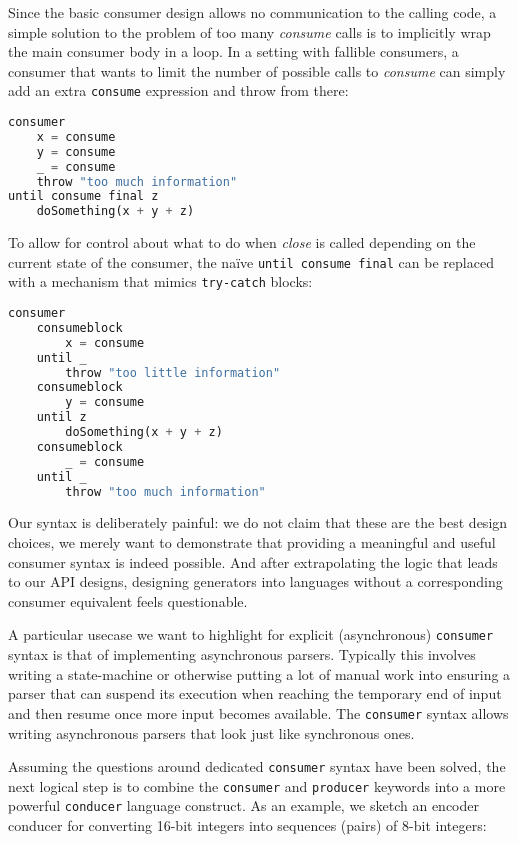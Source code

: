 \documentclass[sigplan,screen,10pt,review]{acmart}
\begin{document}
Since the basic consumer design allows no communication to the calling code, a simple solution to the problem of too many \textit{consume} calls is to implicitly wrap the main consumer body in a loop. In a setting with fallible consumers, a consumer that wants to limit the number of possible calls to \textit{consume} can simply add an extra \texttt{consume} expression and throw from there:

\begin{lstlisting}[language=Python]
consumer
    x = consume
    y = consume
    _ = consume
    throw "too much information"
until consume final z
    doSomething(x + y + z)
\end{lstlisting}

To allow for control about what to do when \textit{close} is called depending on the current state of the consumer, the naïve \texttt{until consume final} can be replaced with a mechanism that mimics \texttt{try-catch} blocks:

\begin{lstlisting}[language=Python]
consumer
    consumeblock
        x = consume
    until _
        throw "too little information"
    consumeblock
        y = consume
    until z
        doSomething(x + y + z)
    consumeblock
        _ = consume
    until _
        throw "too much information"
\end{lstlisting}

Our syntax is deliberately painful: we do not claim that these are the best design choices, we merely want to demonstrate that providing a meaningful and useful consumer syntax is indeed possible. And after extrapolating the logic that leads to our API designs, designing generators into languages without a corresponding consumer equivalent feels questionable.

A particular usecase we want to highlight for explicit (asynchronous) \texttt{consumer} syntax is that of implementing asynchronous parsers. Typically this involves writing a state-machine or otherwise putting a lot of manual work into ensuring a parser that can suspend its execution when reaching the temporary end of input and then resume once more input becomes available. The \texttt{consumer} syntax allows writing asynchronous parsers that look just like synchronous ones.

Assuming the questions around dedicated \texttt{consumer} syntax have been solved, the next logical step is to combine the \texttt{consumer} and \texttt{producer} keywords into a more powerful \texttt{conducer} language construct. As an example, we sketch an encoder conducer for converting 16-bit integers into sequences (pairs) of 8-bit integers:
\end{document}
